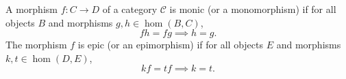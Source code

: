 A morphism $f : C \to D$ of a category $\mathcal{C}$ is monic (or a monomorphism) if for all objects $B$ and morphisms $g, h \in \hom(B, C)$,
\[
fh = fg \implies h = g.
\]
The morphism $f$ is epic (or an epimorphism) if for all objects $E$ and morphisms $k, t \in \hom(D, E)$,
\[
kf = tf \implies k = t.
\]
